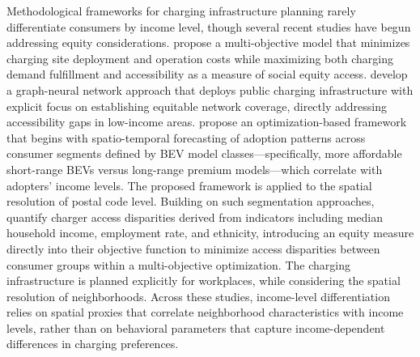         Methodological frameworks for charging infrastructure planning rarely differentiate consumers by income level, though several recent studies have begun addressing equity considerations. \citet{LONI2023128796} propose a multi-objective model that minimizes charging site deployment and operation costs while maximizing both charging demand fulfillment and accessibility as a measure of social equity access. \citet{BATIC2025135834} develop a graph-neural network approach that deploys public charging infrastructure with explicit focus on establishing equitable network coverage, directly addressing accessibility gaps in low-income areas. \citet{info16110933} propose an optimization-based framework that begins with spatio-temporal forecasting of adoption patterns across consumer segments defined by \ac{BEV} model classes—specifically, more affordable short-range \acp{BEV} versus long-range premium models—which correlate with adopters' income levels. The proposed framework is applied to the spatial resolution of postal code level. Building on such segmentation approaches, \citet{WANG2026105089} quantify charger access disparities derived from indicators including median household income, employment rate, and ethnicity, introducing an equity measure directly into their objective function to minimize access disparities between consumer groups within a multi-objective optimization. The charging infrastructure is planned explicitly for workplaces, while considering the spatial resolution of neighborhoods. Across these studies, income-level differentiation relies on spatial proxies that correlate neighborhood characteristics with income levels, rather than on behavioral parameters that capture income-dependent differences in charging preferences.

